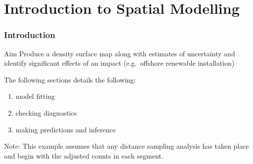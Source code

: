 \section{Introduction to Spatial Modelling} 
\begin{frame}
\frametitle{Introduction} 

\begin{block}{Aim}
Produce a density surface map along with estimates of uncertainty and identify significant effects of an impact (e.g.\ offshore renewable installation)
\end{block}

The following sections details the following:

\begin{enumerate}
  \item model fitting 
  \item checking diagnostics
  \item making predictions and inference
\end{enumerate}

\bigskip

Note: This example assumes that any distance sampling analysis has taken place and begin with the adjusted counts in each segment.  
\end{frame}



